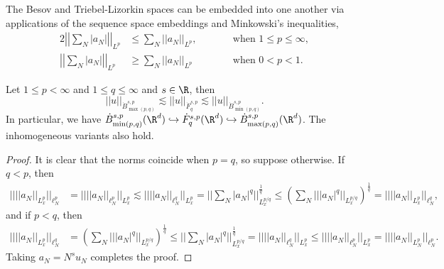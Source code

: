 The Besov and Triebel-Lizorkin spaces can be embedded into one another via applications of the sequence space embeddings and Minkowski's inequalities, 
	\begin{alignat*}{2}
		\left|\left| \sum_N |a_N| \right|\right|_{L^p} 
			&\leq \sum_{N} ||a_N||_{L^p},		&&\qquad\text{when $1 \leq p \leq \infty$},\\
		\left|\left| \sum_N |a_N| \right|\right|_{L^p} 
			&\geq \sum_{N} ||a_N||_{L^p}
				&&\qquad \text{when $0 < p < 1$}.
	\end{alignat*}

\begin{proposition}
	Let $1 \leq p < \infty$ and $1 \leq q \leq \infty$ and $s \in \R$, then 
		\[ ||u||_{\dot B^{s, p}_{\max(p, q)}} \lesssim ||u||_{\dot F^{s, p}_q} \lesssim  ||u||_{\dot B^{s, p}_{\min(p, q)}}.  \]
	In particular, we have $\dot B^{s, p}_{\min(p, q)} (\R^d) \hookrightarrow \dot F^{s, p}_q  (\R^d) \hookrightarrow \dot B^{s, p}_{\max(p, q)} (\R^d)$. The inhomogeneous variants also hold. 
\end{proposition}

\begin{proof}
	It is clear that the norms coincide when $p = q$, so suppose otherwise. If $q < p$, then 
		\begin{align*}
			\Big|\Big| ||a_N||_{L^p_x}\Big|\Big|_{\ell^p_N} 
				&= \Big|\Big| ||a_N||_{\ell^p_N}\Big|\Big|_{L^p_x}  \lesssim\Big|\Big| ||a_N||_{\ell^q_N}\Big|\Big|_{L^p_x} = \Big|\Big| \sum_N |a_N|^q \Big|\Big|_{L^{p/q}_x}^{\frac1q} \leq \left( \sum_N ||
|a_N|^q||_{L^{p/q}_x} \right)^{\frac1q} = 	\Big|\Big| ||a_N||_{L^p_x}\Big|\Big|_{\ell^q_N},
		\end{align*}
	and if $p < q$, then
		\begin{align*}
			\Big|\Big| ||a_N||_{L^p_x}\Big|\Big|_{\ell^q_N} 
				&= \left(\sum_N || |a_N|^q ||_{L^{p/q}_x}\right)^{\frac1q}  \leq   \Big|\Big| \sum_N |a_N|^q \Big|\Big|_{L^{p/q}_x}^{\frac1q} = \Big|\Big|  ||a_N||_{\ell^q_N}\Big|\Big|_{L^{p}_x} \leq \Big|\Big|  ||a_N||_{\ell^p_N}\Big|\Big|_{L^{p}_x} = 	\Big|\Big|  ||a_N||_{L^p_N}\Big|\Big|_{\ell^{p}_N}.
		\end{align*}
	Taking $a_N = N^s u_N$ completes the proof. 	
\end{proof}